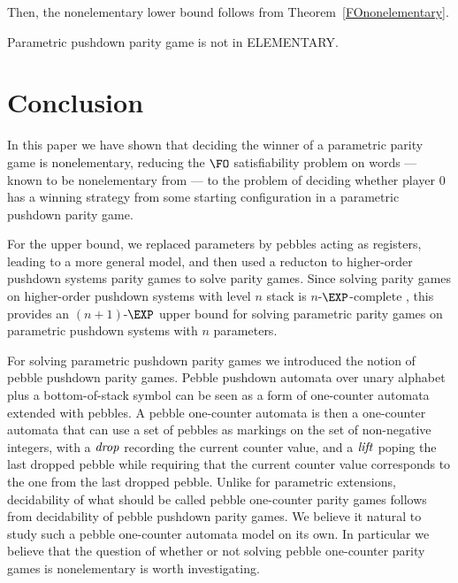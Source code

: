 \documentclass[a4paper,UKenglish,cleveref, autoref, thm-restate]{lipics-v2021}
\begin{document}
Then, the nonelementary lower bound follows from Theorem~\ref{FOnonelementary}. 



\begin{theorem}
{\sc Parametric pushdown parity game} is not in {\sc ELEMENTARY}.
\end{theorem}





\section{Conclusion}

In this paper we have shown that
deciding
the winner of a parametric parity game
is nonelementary, reducing the $\FO$ satisfiability problem on words \---- known to be nonelementary
from \cite{Sto74} \---- to the
problem of deciding whether player $0$ has a winning strategy from some starting configuration in 
a parametric pushdown parity game.

	For the upper bound, we replaced parameters by pebbles acting as registers, leading to a more general model, and then used a reducton to higher-order pushdown systems parity games to solve parity games. Since solving parity games on higher-order pushdown systems with level $n$ stack is $n$-$\EXP$-complete \cite{ Cach03, cachat2007complexity}, this provides an $(n+1)$-$\EXP$ upper bound for solving parametric parity games on parametric pushdown systems with $n$ parameters.


For solving parametric pushdown parity games we introduced the notion of pebble pushdown parity games.
Pebble pushdown automata over unary alphabet plus a bottom-of-stack symbol
can be seen as a form of one-counter automata extended with pebbles. 
A pebble one-counter automata is then a one-counter automata that
can use a set of pebbles as markings on the set of non-negative integers, with a 
$\text{\textit{drop}}$ recording the current counter value, and a 
$\text{\textit{lift}}$ poping the last dropped
pebble while requiring that the current counter value 
corresponds to the one from the last dropped pebble.
%
Unlike for parametric extensions, 
decidability of 
what should be called
pebble one-counter parity games follows from
decidability of pebble pushdown parity games. 
We believe it natural to study such a pebble one-counter automata model
on its own.
In particular we believe that the question of whether or not
solving pebble one-counter parity games is nonelementary is worth investigating.
\end{document}

